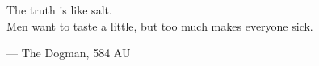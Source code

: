 \begin{flushright}
\begin{hangleftquote}{\QENOpen}{\QENClose}
The truth is like salt.\\
Men want to taste a little, but too much makes everyone sick.
\end{hangleftquote}
\par\smallskip
\normalfont — The Dogman, 584 AU
\end{flushright}
